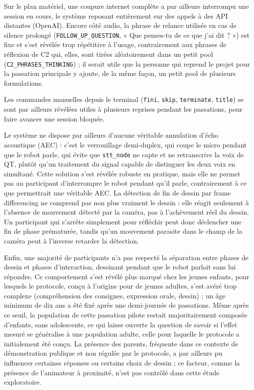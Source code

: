 \documentclass[11pt]{article}
\begin{document}
Sur le plan matériel, une coupure internet complète a par ailleurs interrompu une session en cours, le système reposant entièrement sur des appels à des API distantes (OpenAI).
Encore côté audio, la phrase de relance utilisée en cas de silence prolongé (\texttt{FOLLOW\_UP\_QUESTION}, « Que penses-tu de ce que j'ai dit ? ») est fixe et s'est révélée trop répétitive à l'usage, contrairement aux phrases de réflexion de C2 qui, elles, sont tirées aléatoirement dans un petit pool (\texttt{C2\_PHRASES\_THINKING}) ; il serait utile que la personne qui reprend le projet pour la passation principale y ajoute, de la même façon, un petit pool de plusieurs formulations.

Les commandes manuelles depuis le terminal (\texttt{fini}, \texttt{skip}, \texttt{terminate}, \texttt{title}) se sont par ailleurs révélées utiles à plusieurs reprises pendant les passations, pour faire avancer une session bloquée.

Le système ne dispose par ailleurs d'aucune véritable annulation d'écho acoustique (AEC) : c'est le verrouillage demi-duplex, qui coupe le micro pendant que le robot parle, qui évite que \texttt{stt\_node} ne capte et ne retranscrive la voix de QT, plutôt qu'un traitement du signal capable de distinguer les deux voix en simultané. Cette solution s'est révélée robuste en pratique, mais elle ne permet pas au participant d'interrompre le robot pendant qu'il parle, contrairement à ce que permettrait une véritable AEC.
La détection de fin de dessin par frame differencing ne comprend pas non plus vraiment le dessin : elle réagit seulement à l'absence de mouvement détecté par la caméra, pas à l'achèvement réel du dessin. Un participant qui s'arrête simplement pour réfléchir peut donc déclencher une fin de phase prématurée, tandis qu'un mouvement parasite dans le champ de la caméra peut à l'inverse retarder la détection.

Enfin, une majorité de participants n'a pas respecté la séparation entre phases de dessin et phases d'interaction, dessinant pendant que le robot parlait sans lui répondre.
Ce comportement s'est révélé plus marqué chez les jeunes enfants, pour lesquels le protocole, conçu à l'origine pour de jeunes adultes, s'est avéré trop complexe (compréhension des consignes, expression orale, dessin) ; un âge minimum de dix ans a été fixé après une demi-journée de passations.
Même après ce seuil, la population de cette passation pilote restait majoritairement composée d'enfants, sans adolescents, ce qui laisse ouverte la question de savoir si l'effet mesuré se généralise à une population adulte, celle pour laquelle le protocole a initialement été conçu.
La présence des parents, fréquente dans ce contexte de démonstration publique et non régulée par le protocole, a par ailleurs pu influencer certaines réponses ou certains choix de dessin ; ce facteur, comme la présence de l'animateur à proximité, n'est pas contrôlé dans cette étude exploratoire.
\end{document}
